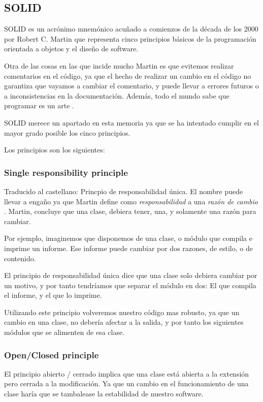 \subsection{SOLID}
SOLID es un acr\'{o}nimo mnem\'{o}nico acu\~{n}ado a comienzos de la d\'{e}cada de los 2000 por 
Robert C. Martin \cite{SOLID:ADefinition}
que representa cinco principios b\'{a}sicos de la programaci\'{o}n orientada a objetos y el dise\~{n}o de software.

Otra de las cosas en las que incide mucho Martin es que evitemos realizar comentarios en el c\'odigo,
ya que el hecho de realizar un cambio en el c\'odigo no garantiza que vayamos a cambiar el comentario, y 
puede llevar a errores futuros o a inconsistencias en la documentaci\'on. Adem\'as, todo el mundo sabe que programar
es un arte \cite{Art:Programming}.

SOLID merece un apartado en esta memoria ya que se ha intentado cumplir en el mayor grado posible los cinco principios.

Los principios son los siguientes:
\subsubsection{Single responsibility principle}
Traducido al castellano: Princpio de responsabilidad \'{u}nica. El nombre puede llevar a enga\~{n}o ya que Martin define como 
\emph{responsabilidad}
a una \emph{raz\'{o}n de cambio} \cite{SOLID:SRP}. Martin, concluye que una clase, debiera tener, una, y solamente una raz\'{o}n 
para cambiar.

Por ejemplo, imaginemos que disponemos de una clase, o m\'{o}dulo que compila e imprime un informe. 
Ese informe puede cambiar por dos razones, de estilo, o de contenido. 

El principio de responsabilidad \'{u}nica dice que una clase solo debiera cambiar por un motivo, y por 
tanto tendr\'{i}amos que separar el m\'{o}dulo en dos: El que compila el informe, y el que lo imprime.

Utilizando este principio volveremos nuestro c\'{o}digo mas robusto, ya que un cambio en una clase, no 
deber\'{i}a afectar a la salida, y por tanto los siguientes m\'{o}dulos que se alimenten de esa clase.

\subsubsection{Open/Closed principle}
El principio abierto / cerrado \cite{SOLID:OCP} implica que una clase est\'{a} abierta a la extensi\'{o}n pero cerrada a la modificaci\'{o}n. Ya que un cambio en el
funcionamiento de una clase har\'{i}a que se tambalease la estabilidad de nuestro software.

